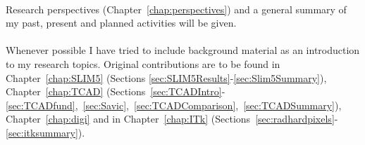 \\ Research perspectives (Chapter~\ref{chap:perspectives}) and a general summary of my past, present 
and planned activities will be given.
\\
\\
Whenever possible I have tried to include background material as an introduction to my research topics. 
Original contributions are to be found in Chapter~\ref{chap:SLIM5} (Sections \ref{sec:SLIM5Results}-\ref{sec:Slim5Summary}), Chapter~\ref{chap:TCAD} (Sections~\ref{sec:TCADIntro}-\ref{sec:TCADfund},~\ref{sec:Savic},~\ref{sec:TCADComparison},~\ref{sec:TCADSummary}), Chapter~\ref{chap:digi} and in 
Chapter~\ref{chap:ITk} (Sections~\ref{sec:radhardpixels}-\ref{sec:itksummary}).




